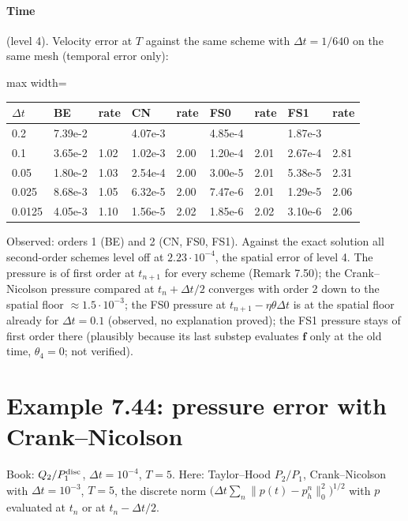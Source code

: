 \documentclass[11pt,a4paper]{article}
\newcommand{\bff}{\boldsymbol{f}}
\newcommand{\dt}{\Delta t}
\begin{document}
\paragraph{Time} (level 4). Velocity error at $T$ against the same scheme with $\dt=1/640$ on the same mesh (temporal
error only):
\begin{center}\begin{adjustbox}{max width=\textwidth}
\begin{tabular}{lllllllll}
\toprule
$\dt$ & BE & rate & CN & rate & FS0 & rate & FS1 & rate\\
\midrule
0.2 & 7.39e-2 & & 4.07e-3 & & 4.85e-4 & & 1.87e-3 &\\
0.1 & 3.65e-2 & 1.02 & 1.02e-3 & 2.00 & 1.20e-4 & 2.01 & 2.67e-4 & 2.81\\
0.05 & 1.80e-2 & 1.03 & 2.54e-4 & 2.00 & 3.00e-5 & 2.01 & 5.38e-5 & 2.31\\
0.025 & 8.68e-3 & 1.05 & 6.32e-5 & 2.00 & 7.47e-6 & 2.01 & 1.29e-5 & 2.06\\
0.0125 & 4.05e-3 & 1.10 & 1.56e-5 & 2.02 & 1.85e-6 & 2.02 & 3.10e-6 & 2.06\\
\bottomrule
\end{tabular}
\end{adjustbox}\end{center}
Observed: orders 1 (BE) and 2 (CN, FS0, FS1). Against the exact solution all second-order schemes level off at
$2.23\cdot10^{-4}$, the spatial error of level 4. The pressure is of first order at $t_{n+1}$ for every scheme
(Remark 7.50); the Crank--Nicolson pressure compared at $t_n+\dt/2$ converges with order 2 down to the spatial floor
$\approx1.5\cdot10^{-3}$; the FS0 pressure at $t_{n+1}-\eta\theta\dt$ is at the spatial floor already for $\dt=0.1$
(observed, no explanation proved); the FS1 pressure stays of first order there (plausibly because its last substep
evaluates $\bff$ only at the old time, $\theta_4=0$; not verified).

\section{Example 7.44: pressure error with Crank--Nicolson}

Book: $Q_2/P_1^{\rm disc}$, $\dt=10^{-4}$, $T=5$. Here: Taylor--Hood $P_2/P_1$, Crank--Nicolson with $\dt=10^{-3}$, $T=5$,
the discrete norm $\big(\dt\sum_n\|p(t)-p_h^n\|_0^2\big)^{1/2}$ with $p$ evaluated at $t_n$ or at $t_n-\dt/2$.
\end{document}
